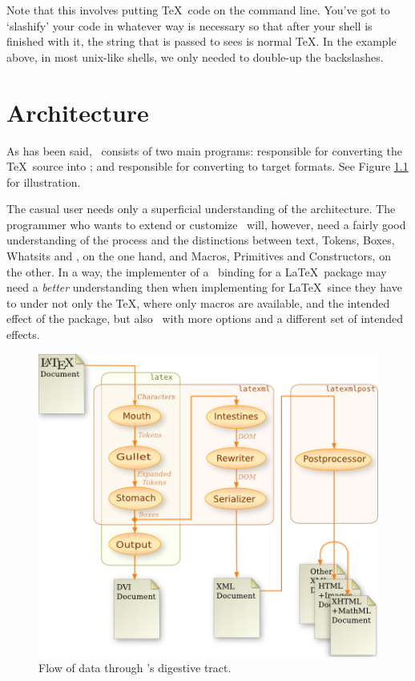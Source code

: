 \documentclass{book}
\begin{document}
Note that this involves putting \TeX\ code on the command line.
You've got to `slashify' your code in whatever way is necessary
so that after your shell is finished with it, the string that
is passed to  sees is normal \TeX.  In the
example above, in most unix-like shells, we only needed to
double-up the backslashes.

\chapter{Architecture}\label{architecture}
As has been said, \LaTeXML\ consists of two main programs:
 responsible for converting the \TeX\ source into \XML;
and  responsible for converting to target formats.
See Figure \ref{fig:dataflow} for illustration.

The casual user needs only a superficial understanding of the architecture.
The programmer who wants to extend or customize \LaTeXML\ will, however,
need a fairly good understanding of the process and the distinctions between
text, Tokens, Boxes, Whatsits and \XML, on the one hand,
and Macros, Primitives and Constructors, on the other.
In a way, the implementer of a \LaTeXML\ binding for a \LaTeX\ package may
need a \emph{better} understanding then when implementing for \LaTeX\
since they have to under not only the \TeX, where only macros are available,
and the intended effect of the package, but also \LaTeXML\ with more options
and a different set of intended effects.

\begin{figure}[tb]
\begin{center}
\includegraphics[width=\textwidth]{figures/digestion}
\end{center}
\caption{Flow of data through \LaTeXML's digestive tract.\label{fig:dataflow}}
\end{figure}
\end{document}
